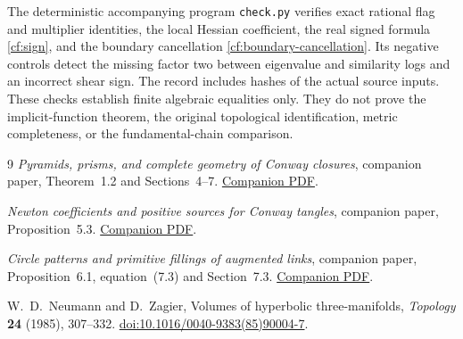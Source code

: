 The deterministic accompanying program \texttt{check.py}
verifies exact rational flag and multiplier identities,
the local Hessian coefficient, the real signed formula
\eqref{cf:sign}, and the boundary cancellation
\eqref{cf:boundary-cancellation}. Its negative controls
detect the missing factor two between eigenvalue and
similarity logs and an incorrect shear sign.
The record includes hashes of the actual source inputs.
These checks establish finite algebraic equalities only.
They do not prove the implicit-function theorem, the original
topological identification, metric completeness, or the
fundamental-chain comparison.

\begin{thebibliography}{9}
\emph{Pyramids, prisms, and complete geometry of Conway closures},
companion paper, Theorem~1.2 and Sections~4--7.
\href{https://sashakolpakov.github.io/murakamis_dream/papers/conway-geometry.pdf}
{Companion PDF}.

\emph{Newton coefficients and positive sources for Conway tangles},
companion paper, Proposition~5.3.
\href{https://sashakolpakov.github.io/murakamis_dream/papers/newton-tangles.pdf}
{Companion PDF}.

\emph{Circle patterns and primitive fillings of augmented links},
companion paper, Proposition~6.1, equation~(7.3) and Section~7.3.
\href{https://sashakolpakov.github.io/murakamis_dream/papers/marked-fillings.pdf}
{Companion PDF}.

W.~D.~Neumann and D.~Zagier, Volumes of hyperbolic three-manifolds,
\emph{Topology} \textbf{24} (1985), 307--332.
\href{https://doi.org/10.1016/0040-9383(85)90004-7}
{doi:10.1016/0040-9383(85)90004-7}.
\end{thebibliography}
